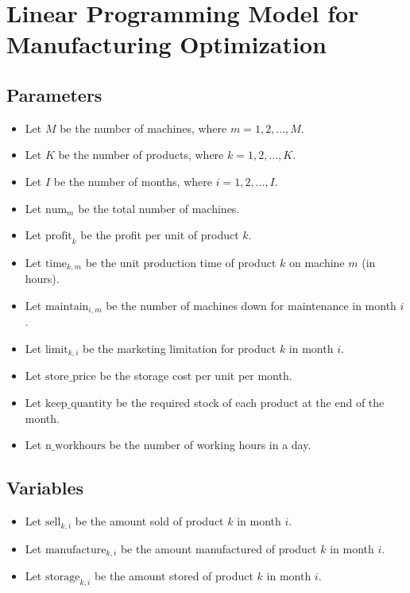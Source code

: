 \documentclass{article}
\begin{document}
\section*{Linear Programming Model for Manufacturing Optimization}

\subsection*{Parameters}
\begin{itemize}
    \item Let $M$ be the number of machines, where $m = 1, 2, ..., M$.
    \item Let $K$ be the number of products, where $k = 1, 2, ..., K$.
    \item Let $I$ be the number of months, where $i = 1, 2, ..., I$.
    \item Let $\text{num}_m$ be the total number of machines.
    \item Let $\text{profit}_k$ be the profit per unit of product $k$.
    \item Let $\text{time}_{k,m}$ be the unit production time of product $k$ on machine $m$ (in hours).
    \item Let $\text{maintain}_{i,m}$ be the number of machines down for maintenance in month $i$.
    \item Let $\text{limit}_{k,i}$ be the marketing limitation for product $k$ in month $i$.
    \item Let $\text{store\_price}$ be the storage cost per unit per month.
    \item Let $\text{keep\_quantity}$ be the required stock of each product at the end of the month.
    \item Let $\text{n\_workhours}$ be the number of working hours in a day.
\end{itemize}

\subsection*{Variables}
\begin{itemize}
    \item Let $\text{sell}_{k,i}$ be the amount sold of product $k$ in month $i$.
    \item Let $\text{manufacture}_{k,i}$ be the amount manufactured of product $k$ in month $i$.
    \item Let $\text{storage}_{k,i}$ be the amount stored of product $k$ in month $i$.
\end{itemize}
\end{document}
